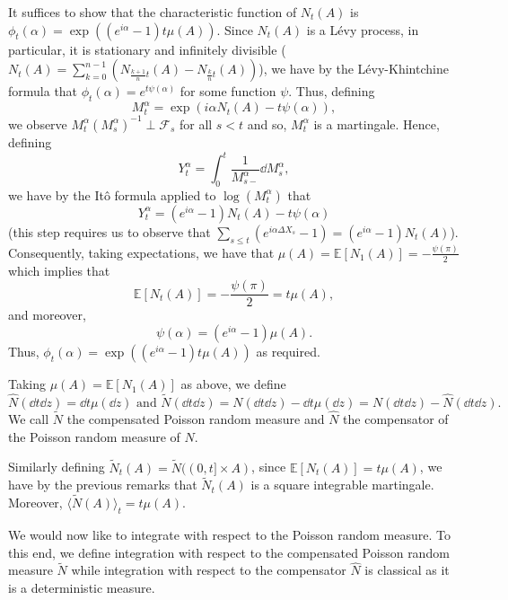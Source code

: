 \documentclass[]{article}
\theoremstyle{definition}
\theoremstyle{definition}
\begin{document}
It suffices to show that the characteristic function of \(N_t(A)\) is \(\phi_t(\alpha) = \exp((e^{i\alpha} - 1)t\mu(A))\).
Since \(N_t(A)\) is a L\'evy process, in particular, it is stationary and infinitely divisible 
(\(N_t(A) = \sum_{k = 0}^{n - 1} (N_{\frac{k + 1}{n}t}(A) - N_{\frac{k}{n}t}(A))\)), 
we have by the L\'evy-Khintchine formula that \(\phi_t(\alpha) = e^{t\psi(\alpha)}\) for some function \(\psi\). Thus, defining 
\[M_t^\alpha = \exp(i\alpha N_t(A) - t \psi(\alpha)),\]
we observe \(M_t^\alpha (M_s^\alpha)^{-1} \perp \mathcal{F}_s\) for all \(s < t\) and so, \(M_t^\alpha\) is a martingale.
Hence, defining 
\[Y_t^\alpha = \int_0^t \frac{1}{M_{s-}^\alpha} \dd M_s^\alpha,\]
we have by the It\^o formula applied to \(\log(M_t^\alpha)\) that
\[Y_t^\alpha = (e^{i\alpha} - 1)N_t(A) - t\psi(\alpha)\]
(this step requires us to observe that 
\(\sum_{s \le t} (e^{i\alpha \Delta X_s} - 1) = (e^{i\alpha} - 1)N_t(A)\)). 
Consequently, taking expectations, we have that 
\(\mu(A) = \mathbb{E}[N_1(A)] = -\frac{\psi(\pi)}{2}\) which implies that 
\[\mathbb{E}[N_t(A)] = -\frac{\psi(\pi)}{2} = t \mu(A),\]
and moreover, 
\[\psi(\alpha) = (e^{i\alpha} - 1)\mu(A).\]
Thus, \(\phi_t(\alpha) = \exp((e^{i\alpha} - 1)t\mu(A))\) as required.

Taking \(\mu(A) = \mathbb{E}[N_1(A)]\) as above, we define 
\[\hat N(\dd t \dd z) = \dd t \mu(\dd z) \text{ and } 
  \tilde N(\dd t \dd z) = N(\dd t \dd z) - \dd t \mu(\dd z) = N(\dd t \dd z) - \hat N(\dd t \dd z).\]
We call \(\tilde N\) the compensated Poisson random measure and \(\hat N\) the compensator of 
the Poisson random measure of \(N\).

Similarly defining \(\tilde N_t(A) = \tilde N((0, t] \times A)\), since \(\mathbb{E}[N_t(A)] = t\mu(A)\),
we have by the previous remarks that \(\tilde N_t(A)\) is a square integrable martingale. Moreover, 
\(\langle \tilde N(A)\rangle_t = t \mu(A)\). 

We would now like to integrate with respect to the Poisson random measure. To this end, we define 
integration with respect to the compensated Poisson random measure \(\tilde N\) while integration 
with respect to the compensator \(\hat N\) is classical as it is a deterministic measure.
\end{document}
